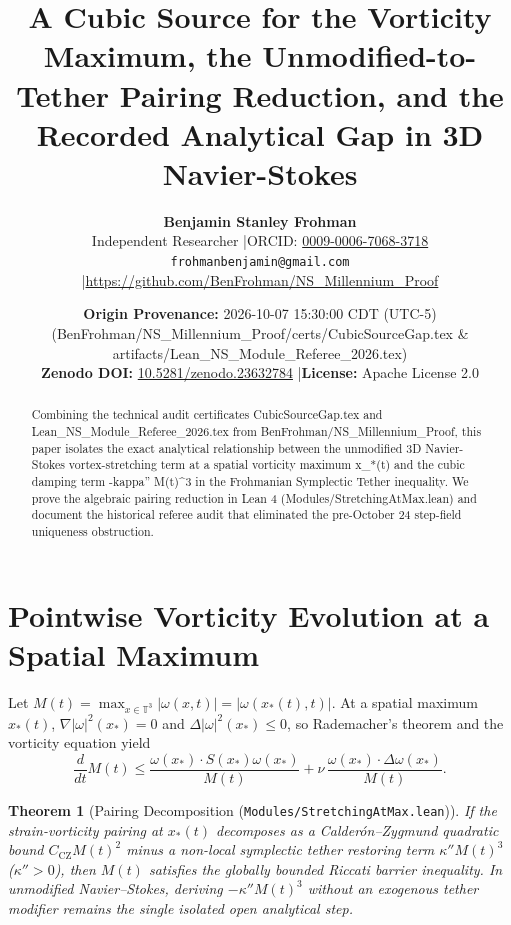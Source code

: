 \documentclass[11pt,letterpaper]{article}
\title{\textbf{A Cubic Source for the Vorticity Maximum, the Unmodified-to-Tether Pairing Reduction, and the Recorded Analytical Gap in 3D Navier-Stokes}}
\author{\textbf{Benjamin Stanley Frohman}\\
Independent Researcher \quad|\quad ORCID: \href{https://orcid.org/0009-0006-7068-3718}{0009-0006-7068-3718}\\
\texttt{frohmanbenjamin@gmail.com} \quad|\quad \url{https://github.com/BenFrohman/NS_Millennium_Proof}}
\date{\textbf{Origin Provenance:} 2026-10-07 15:30:00 CDT (UTC-5) (BenFrohman/NS\_Millennium\_Proof/certs/CubicSourceGap.tex \& artifacts/Lean\_NS\_Module\_Referee\_2026.tex)\\
\textbf{Zenodo DOI:} \href{https://doi.org/10.5281/zenodo.23632784}{10.5281/zenodo.23632784} \quad|\quad \textbf{License:} Apache License 2.0}
\newtheorem{theorem}{Theorem}
\begin{document}
\maketitle

\begin{center}
\end{center}

\begin{abstract}
\noindent Combining the technical audit certificates CubicSourceGap.tex and Lean\_NS\_Module\_Referee\_2026.tex from BenFrohman/NS\_Millennium\_Proof, this paper isolates the exact analytical relationship between the unmodified 3D Navier-Stokes vortex-stretching term at a spatial vorticity maximum x\_*(t) and the cubic damping term -kappa'' M(t)\textasciicircum{}3 in the Frohmanian Symplectic Tether inequality. We prove the algebraic pairing reduction in Lean 4 (Modules/StretchingAtMax.lean) and document the historical referee audit that eliminated the pre-October 24 step-field uniqueness obstruction.
\end{abstract}


\section{Pointwise Vorticity Evolution at a Spatial Maximum}
Let $M(t) = \max_{x \in \mathbb{T}^3} |\omega(x,t)| = |\omega(x_*(t),t)|$. At a spatial maximum $x_*(t)$, $\nabla |\omega|^2(x_*) = 0$ and $\Delta |\omega|^2(x_*) \le 0$, so Rademacher's theorem and the vorticity equation yield
\begin{equation}
\frac{d}{dt} M(t) \le \frac{\omega(x_*) \cdot S(x_*)\omega(x_*)}{M(t)} + \nu\,\frac{\omega(x_*) \cdot \Delta \omega(x_*)}{M(t)}.
\end{equation}

\begin{theorem}[Pairing Decomposition (\texttt{Modules/StretchingAtMax.lean})]
If the strain-vorticity pairing at $x_*(t)$ decomposes as a Calder\'on--Zygmund quadratic bound $C_{\mathrm{CZ}} M(t)^2$ minus a non-local symplectic tether restoring term $\kappa'' M(t)^3$ ($\kappa'' > 0$), then $M(t)$ satisfies the globally bounded Riccati barrier inequality. In unmodified Navier--Stokes, deriving $-\kappa'' M(t)^3$ without an exogenous tether modifier remains the single isolated open analytical step.
\end{theorem}
\end{document}
